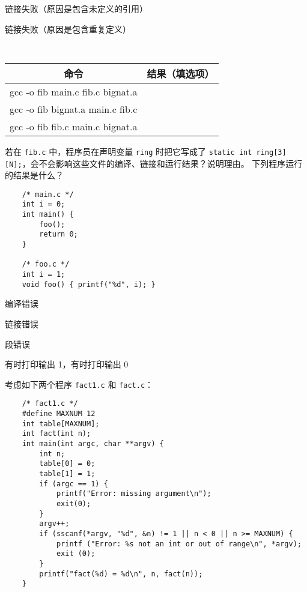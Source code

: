 \begin{problems}
\begin{choices}
            \item 链接失败（原因是包含未定义的引用）
            \item 链接失败（原因是包含重复定义）
        \end{choices}
        \begin{table}[H]
            \tt
            \centering
            \begin{tabular}{|c|c|}
                \hline
                命令 & {\qquad \qquad 结果（填选项）\qquad \qquad} \\ \hline
                gcc -o fib main.c fib.c bignat.a &  \\ \hline
                gcc -o fib bignat.a main.c fib.c &  \\ \hline
                gcc -o fib fib.c main.c bignat.a &  \\ \hline
            \end{tabular}
        \end{table}
        \qn 若在 \verb|fib.c| 中，程序员在声明变量 \verb|ring| 时把它写成了 \verb|static int ring[3][N];|，会不会影响这些文件的编译、链接和运行结果？说明理由。
         下列程序运行的结果是什么？
        \begin{verbatim}
    /* main.c */
    int i = 0;
    int main() {
        foo();
        return 0;
    }
    
    /* foo.c */
    int i = 1;
    void foo() { printf("%d", i); }
        \end{verbatim}
        \begin{choices}
            \item 编译错误
            \item 链接错误
            \item 段错误
            \item 有时打印输出 1，有时打印输出 0
        \end{choices}
         考虑如下两个程序 \verb|fact1.c| 和 \verb|fact.c|：
        \begin{verbatim}
    /* fact1.c */
    #define MAXNUM 12
    int table[MAXNUM];
    int fact(int n);
    int main(int argc, char **argv) {
        int n;
        table[0] = 0;
        table[1] = 1;
        if (argc == 1) {
            printf("Error: missing argument\n");
            exit(0);
        }
        argv++;
        if (sscanf(*argv, "%d", &n) != 1 || n < 0 || n >= MAXNUM) {
            printf ("Error: %s not an int or out of range\n", *argv);
            exit (0);
        }
        printf("fact(%d) = %d\n", n, fact(n));
    }


\end{verbatim}
\end{problems}

